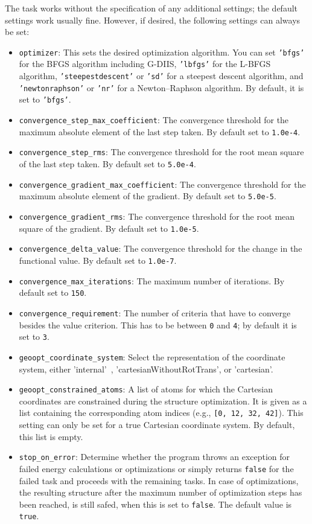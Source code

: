 \documentclass[]{tufte-book}
\begin{document}
The task works without the specification of any additional settings; the default settings work usually fine. However,
if desired, the following settings can always be set:
\begin{itemize}
\item \texttt{optimizer}: This sets the desired optimization algorithm. You can set \texttt{'bfgs'} for the BFGS algorithm including
G-DIIS, \texttt{'lbfgs'} for the L-BFGS algorithm,
\texttt{'steepestdescent'} or \texttt{'sd'} for a steepest descent algorithm, and \texttt{'newtonraphson'} or \texttt{'nr'} for
a Newton--Raphson algorithm. By default, it is set to \texttt{'bfgs'}.
\item \texttt{convergence\_step\_max\_coefficient}: The convergence threshold for the maximum absolute element of the last step taken.
By default set to \texttt{1.0e-4}.
\item \texttt{convergence\_step\_rms}: The convergence threshold for the root mean square of the last step taken. By default set to
\texttt{5.0e-4}.
\item \texttt{convergence\_gradient\_max\_coefficient}: The convergence threshold for the maximum absolute element of the gradient.
By default set to \texttt{5.0e-5}.
\item \texttt{convergence\_gradient\_rms}: The convergence threshold for the root mean square of the gradient. By default set to
\texttt{1.0e-5}.
\item \texttt{convergence\_delta\_value}: The convergence threshold for the change in the functional value. By default set to
\texttt{1.0e-7}.
\item \texttt{convergence\_max\_iterations}: The maximum number of iterations. By default set to \texttt{150}.
\item \texttt{convergence\_requirement}: The number of criteria that have to converge besides the value criterion. This
has to be between \texttt{0} and \texttt{4}; by default it is set to \texttt{3}.
\item \texttt{geoopt\_coordinate\_system}: Select the representation of the coordinate system, either 'internal'~\cite{libirc}, 'cartesianWithoutRotTrans', or 'cartesian'.
\item \texttt{geoopt\_constrained\_atoms}: A list of atoms for which the Cartesian coordinates are constrained during the structure optimization.
  It is given as a list containing the corresponding atom indices (e.g., \texttt{[0, 12, 32, 42]}). This setting can only be set for a true Cartesian coordinate system.
By default, this list is empty.
\item \texttt{stop\_on\_error}: Determine whether the program throws an exception for failed energy calculations or optimizations or simply returns \texttt{false} for the failed task and proceeds with the remaining tasks. In case of optimizations, the resulting structure after the maximum number of optimization steps has been reached, is still safed, when this is set to \texttt{false}. The default value is \texttt{true}.
\end{itemize}
\end{document}
